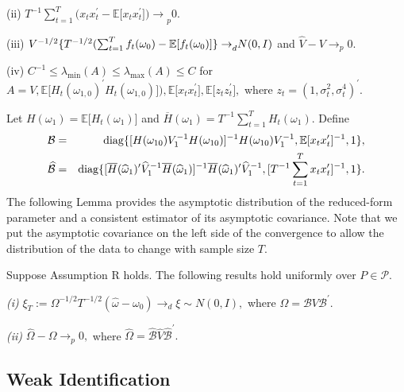 \documentclass[11pt, letterpaper, twoside]{article}
\begin{document}

\noindent (ii) $T^{-1}\sum_{t=1}^{T}(x_{t}x_{t}^{\prime }-\mathbb{E[}%
x_{t}x_{t}^{\prime }\mathbb{])\rightarrow }_{p}0.$

\noindent (iii) $V^{-1/2}\{T^{-1/2}(\sum_{t=1}^{T}f_{t}(\omega _{0})-\mathbb{%
E[}f_{t}(\omega _{0})\mathbb{]\} \rightarrow }_{d}N(0,I)$ and $\widehat{V}%
-V\rightarrow _{p}0.$

\noindent (iv) $C^{-1}\leq \lambda _{\min }(A)\leq \lambda _{\max }(A)\leq C$
for $A=V,\mathbb{E[}H_{t}\left( \omega _{1,0}\right) ^{\prime }H_{t}\left(
\omega _{1,0}\right) ]),\mathbb{E[}x_{t}x_{t}^{\prime }],\mathbb{E[}%
z_{t}z_{t}^{\prime }],$ where $z_{t}=(1,\sigma _{t}^{2},\sigma
_{t}^{4})^{\prime }.$

\smallskip

Let $H(\omega _{1})=\mathbb{E[}H_{t}(\omega _{1})]$ and $\overline{H}(\omega
_{1})=T^{-1}\sum_{t=1}^{T}H_{t}(\omega _{1}).$ Define%
\begin{eqnarray}
\mathcal{B} &=&\diag\{[H(\omega _{10})V_{1}^{-1}H(\omega _{10})]^{-1}H(\omega
_{10})V_{1}^{-1},\mathbb{E[}x_{t}x_{t}^{\prime }]^{-1},1\},  \notag \\
\widehat{\mathcal{B}} &=&\diag\{[\overline{H}(\widehat{\omega }_{1})^{\prime }%
\widehat{V}_{1}^{-1}\overline{H}(\widehat{\omega }_{1})]^{-1}\overline{H}(%
\widehat{\omega }_{1})^{\prime }\widehat{V}_{1}^{-1},[T^{-1}%
\sum_{t=1}^{T}x_{t}x_{t}^{\prime }]^{-1},1\}.  \label{Fhat}
\end{eqnarray}%
The following Lemma provides the asymptotic distribution of the reduced-form
parameter and a consistent estimator of its asymptotic covariance. Note that
we put the asymptotic covariance on the left side of the convergence to
allow the distribution of the data to change with sample size $T.$

\begin{lemma}
\label{Lemma Reduce}Suppose Assumption R holds. The following results hold
uniformly over $P\in \mathcal{P}$.

\noindent \emph{(i)} $\xi _{T}:=\Omega ^{-1/2}T^{-1/2}(\widehat{\omega }%
-\omega _{0})\rightarrow _{d}\xi \sim N(0,I),$ where $\Omega =\mathcal{B}V%
\mathcal{B}^{\prime }.$

\noindent \emph{(ii)} $\widehat{\Omega }-\Omega \rightarrow _{p}0,$ where $%
\widehat{\Omega }=\widehat{\mathcal{B}}\widehat{V}\widehat{\mathcal{B}}%
^{\prime }.$
\end{lemma}

\subsection{Weak Identification}
\end{document}
